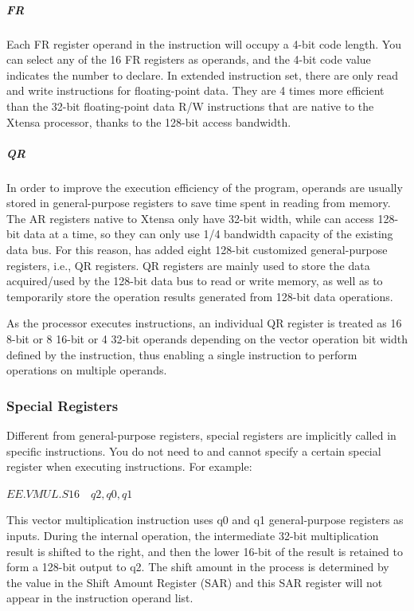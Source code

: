 \documentclass[main\_\_EN.tex]{subfiles}
\begin{document}
\subparagraph{FR}

Each FR register operand in the instruction will occupy a 4-bit code length. You can select any of the 16 FR registers as operands, and the 4-bit code value indicates the number to declare. In \chipname{} extended instruction set, there are only read and write instructions for floating-point data. They are 4 times more efficient than the 32-bit floating-point data R/W instructions that are native to the Xtensa processor, thanks to the 128-bit access bandwidth.

\subparagraph{QR}

In order to improve the execution efficiency of the program, operands are usually stored in general-purpose registers to save time spent in reading from memory. The AR registers native to Xtensa only have 32-bit width, while \chipname{} can access 128-bit data at a time, so they can only use 1/4 bandwidth capacity of the existing data bus. For this reason, \chipname{} has added eight 128-bit customized general-purpose registers, i.e., QR registers. QR registers are mainly used to store the data acquired/used by the 128-bit data bus to read or write memory, as well as to temporarily store the operation results generated from 128-bit data operations.

As the processor executes instructions, an individual QR register is treated as 16 8-bit or 8 16-bit or 4 32-bit operands depending on the vector operation bit width defined by the instruction, thus enabling a single instruction to perform operations on multiple operands.

\subsubsection{Special Registers}
\label{sec:pie-spec-reg}

Different from general-purpose registers, special registers are implicitly called in specific instructions. You do not need to and cannot specify a certain special register when executing instructions. For example:

\begin{center}
    $\hyperref[instruction:EEVMULS16]{EE.VMUL.S16}\hspace{1em}q2, q0, q1$
\end{center}

This vector multiplication instruction uses q0 and q1 general-purpose registers as inputs. During the internal operation, the intermediate 32-bit multiplication result is shifted to the right, and then the lower 16-bit of the result is retained to form a 128-bit output to q2. The shift amount in the process is determined by the value in the Shift Amount Register (SAR) and this SAR register will not appear in the instruction operand list.
\end{document}
